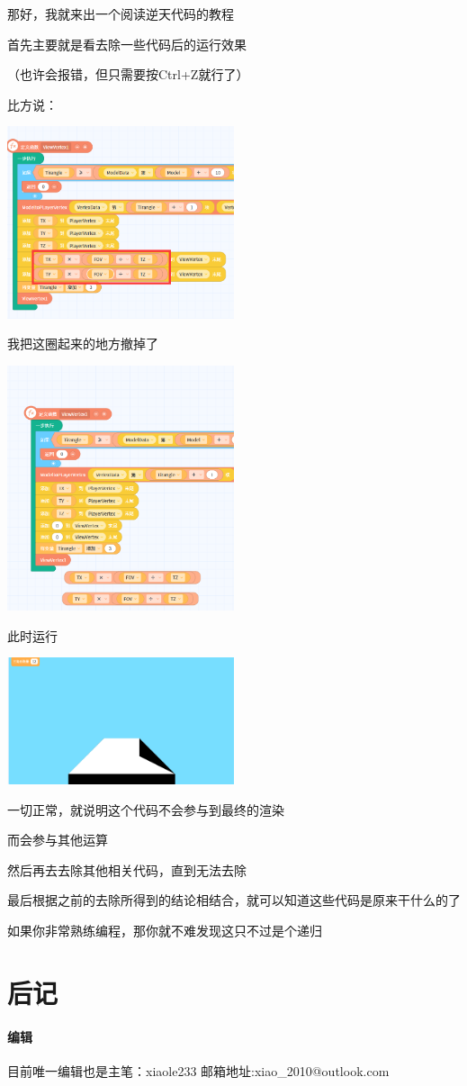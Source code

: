 \documentclass[UTF8,fontset=fandol]{article}
\begin{document}
那好，我就来出一个阅读逆天代码的教程

首先主要就是看去除一些代码后的运行效果

（也许会报错，但只需要按Ctrl+Z就行了）

比方说：

\includegraphics[width=0.5\textwidth]{assets/01/fire-1.png}

我把这圈起来的地方撤掉了

\includegraphics[width=0.5\textwidth]{assets/01/fire-2.png}

此时运行

\includegraphics[width=0.5\textwidth]{assets/01/fire-3.png}

一切正常，就说明这个代码不会参与到最终的渲染

而会参与其他运算

然后再去去除其他相关代码，直到无法去除

最后根据之前的去除所得到的结论相结合，就可以知道这些代码是原来干什么的了

如果你非常熟练编程，那你就不难发现这只不过是个递归

\section{后记}
\paragraph{编辑} 目前唯一编辑也是主笔：xiaole233 邮箱地址:xiao\_2010@outlook.com
\end{document}
